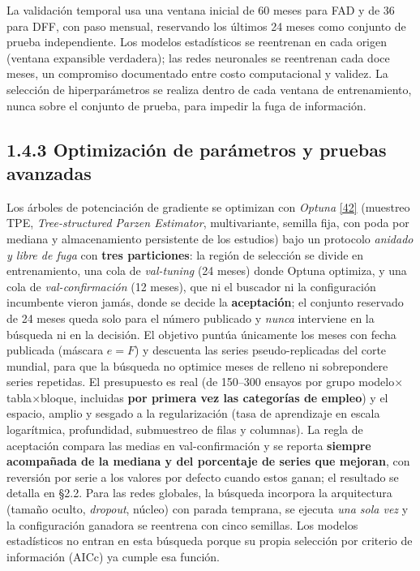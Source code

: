 \documentclass[12pt,letterpaper]{report}
\newcommand{\cita}[1]{\hyperref[bib:#1]{[#1]}}
\begin{document}
La validación temporal usa una ventana inicial de 60 meses para FAD y de 36 para
DFF, con paso mensual, reservando los últimos 24 meses como conjunto de prueba
independiente. Los modelos estadísticos se reentrenan en cada origen (ventana
expansible verdadera); las redes neuronales se reentrenan cada doce meses, un
compromiso documentado entre costo computacional y validez. La selección de
hiperparámetros se realiza dentro de cada ventana de entrenamiento, nunca sobre el
conjunto de prueba, para impedir la fuga de información.

\subsection{1.4.3 Optimización de parámetros y pruebas avanzadas}

Los árboles de potenciación de gradiente se optimizan con \textit{Optuna} \cita{42}
(muestreo TPE, \textit{Tree-structured Parzen Estimator}, multivariante, semilla fija, con
poda por mediana y almacenamiento persistente de los estudios) bajo un protocolo
\textit{anidado y libre de fuga} con \textbf{tres particiones}: la región de selección se
divide en entrenamiento, una cola de \textit{val-tuning} (24 meses) donde Optuna optimiza, y
una cola de \textit{val-confirmación} (12 meses), que ni el buscador ni la configuración
incumbente vieron jamás, donde se decide la \textbf{aceptación}; el conjunto reservado de 24
meses queda solo para el número publicado y \textit{nunca} interviene en la búsqueda ni en
la decisión. El objetivo puntúa únicamente los meses con fecha publicada (máscara $e=F$) y
descuenta las series pseudo-replicadas del corte mundial, para que la búsqueda no optimice
meses de relleno ni sobrepondere series repetidas. El presupuesto es real (de 150--300
ensayos por grupo modelo$\times$tabla$\times$bloque, incluidas \textbf{por primera vez las
categorías de empleo}) y el espacio, amplio y sesgado a la regularización (tasa de
aprendizaje en escala logarítmica, profundidad, submuestreo de filas y columnas). La regla
de aceptación compara las medias en val-confirmación y se reporta \textbf{siempre
acompañada de la mediana y del porcentaje de series que mejoran}, con reversión por serie a
los valores por defecto cuando estos ganan; el resultado se detalla en §2.2. Para las redes
globales, la búsqueda incorpora la arquitectura (tamaño oculto, \textit{dropout},
núcleo) con parada temprana, se ejecuta \textit{una sola vez} y la configuración ganadora se
reentrena con cinco semillas. Los modelos estadísticos no entran en esta búsqueda porque su
propia selección por criterio de información (AICc) ya cumple esa función.
\end{document}
